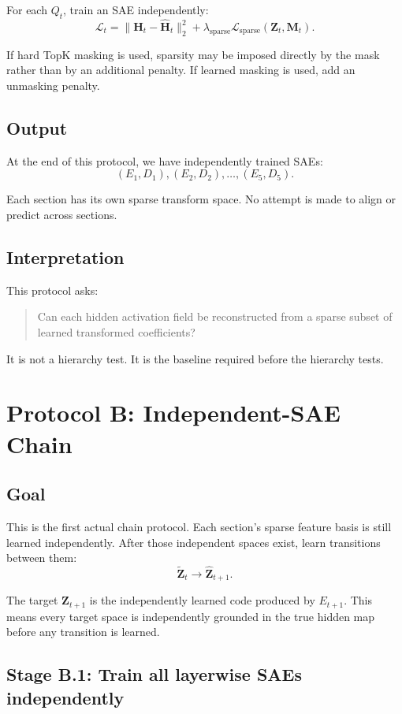 \documentclass[11pt]{article}
\newcommand{\Htens}{\mathbf{H}}
\newcommand{\Ztens}{\mathbf{Z}}
\newcommand{\Mtens}{\mathbf{M}}
\newcommand{\Hhat}{\widehat{\mathbf{H}}}
\newcommand{\Zhat}{\widehat{\mathbf{Z}}}
\newcommand{\Ztilde}{\widetilde{\mathbf{Z}}}
\begin{document}
For each \(Q_t\), train an SAE independently:
\[
\mathcal{L}_{t}
=
\|\Htens_t - \Hhat_t\|_2^2
+
\lambda_{\mathrm{sparse}}\mathcal{L}_{\mathrm{sparse}}(\Ztens_t,\Mtens_t).
\]

If hard TopK masking is used, sparsity may be imposed directly by the mask rather than by an additional penalty. If learned masking is used, add an unmasking penalty.

\subsection{Output}

At the end of this protocol, we have independently trained SAEs:
\[
(E_1,D_1), (E_2,D_2), \ldots, (E_5,D_5).
\]

Each section has its own sparse transform space. No attempt is made to align or predict across sections.

\subsection{Interpretation}

This protocol asks:
\begin{quote}
Can each hidden activation field be reconstructed from a sparse subset of learned transformed coefficients?
\end{quote}

It is not a hierarchy test. It is the baseline required before the hierarchy tests.

\section{Protocol B: Independent-SAE Chain}

\subsection{Goal}

This is the first actual chain protocol. Each section's sparse feature basis is still learned independently. After those independent spaces exist, learn transitions between them:
\[
\Ztilde_t \rightarrow \Zhat_{t+1}.
\]

The target \(\Ztens_{t+1}\) is the independently learned code produced by \(E_{t+1}\). This means every target space is independently grounded in the true hidden map before any transition is learned.

\subsection{Stage B.1: Train all layerwise SAEs independently}
\end{document}
